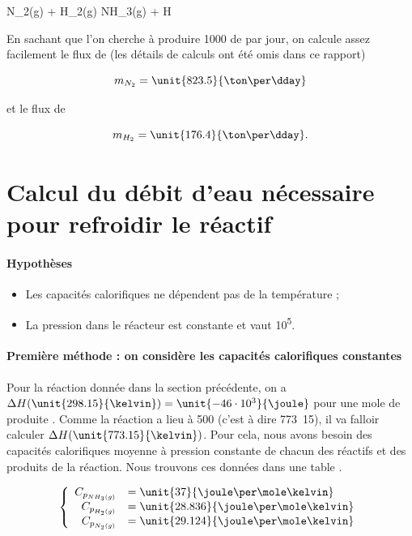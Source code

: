 	\begin{chemmath}
			N_2(g) + H_2(g) \longrightarrow NH_3(g) + \Delta H
 	\end{chemmath}
	
En sachant que l'on cherche à produire \unit{1000}{\ton} de  par jour, 
on calcule assez facilement le flux de  (les détails de calculs ont été omis
dans ce rapport)

	$$m_{N_2} = \unit{823.5}{\ton\per\dday}$$

et le flux de 

	$$m_{H_2} = \unit{176.4}{\ton\per\dday}.$$

\section{Calcul du débit d'eau nécessaire pour refroidir le réactif}
\paragraph{Hypothèses}
\begin{itemize}
	\item Les capacités calorifiques ne dépendent pas de la température ;
	\item La pression dans le réacteur est constante et vaut \unit{10^5}{\pascal}.
\end{itemize}

\paragraph{Première méthode : on considère les capacités calorifiques constantes}
Pour la réaction donnée dans la section précédente, on a $\Delta H(\unit{298.15}{\kelvin})
 = \unit{-46 \cdot 10^3}{\joule}$ pour une mole de  produite \cite{atkins}.
Comme la réaction a lieu à \unit{500}{\celsius} (c'est à dire \unit{773.15}{\kelvin}), il
va falloir calculer $\Delta H(\unit{773.15}{\kelvin})$. Pour cela, nous avons besoin
des capacités calorifiques moyenne à pression constante de chacun des réactifs et des produits
de la réaction. Nous trouvons ces données dans une table \cite{atkins}.

	$$
	\left\{
		\begin{array}{rl}
			C_{p_{NH_3(g)}} &= \unit{37}{\joule\per\mole\kelvin}\\
			C_{p_{H_2(g)}} 	&= \unit{28.836}{\joule\per\mole\kelvin}\\
			C_{p_{N_2(g)}} 	&= \unit{29.124}{\joule\per\mole\kelvin}
		\end{array}
	\right.
	$$

